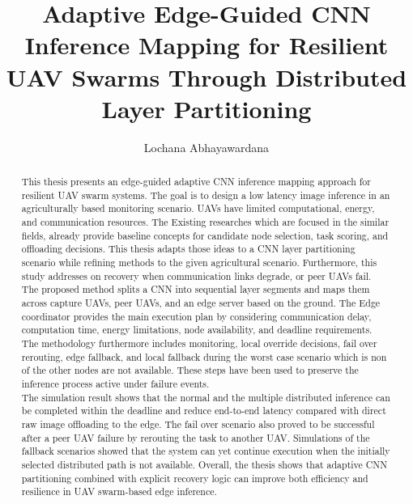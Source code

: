 \documentclass[HSHL, BachelorThesis]{teamhenkler}
\title{Adaptive Edge-Guided CNN Inference Mapping for Resilient UAV Swarms Through Distributed Layer Partitioning}
\author{Lochana Abhayawardana}
\begin{document}
\maketitle
\begin{abstract}
This thesis presents an edge-guided adaptive CNN inference mapping approach for resilient UAV swarm systems. The goal is to design a low latency image inference in an agriculturally based monitoring scenario. UAVs have limited computational, energy, and communication resources. The Existing researches which are focused in the similar fields, already provide baseline concepts for candidate node selection, task scoring, and offloading decisions. This thesis adapts those ideas to a CNN layer partitioning scenario while refining methods to the given agricultural scenario. Furthermore, this study addresses on recovery when communication links degrade, or peer UAVs fail.\\

The proposed method splits a CNN into sequential layer segments and maps them across capture UAVs, peer UAVs, and an edge server based on the ground.  The Edge coordinator provides the main execution plan by considering communication delay, computation time, energy limitations, node availability, and deadline requirements. The methodology furthermore includes monitoring, local override decisions, fail over rerouting, edge fallback, and local fallback during the worst case scenario which is non of the other nodes are not available. These steps have been used to preserve the inference process active under failure events. \\ 


The simulation result shows that the normal and the multiple distributed inference can be completed within the deadline and reduce end-to-end latency compared with direct raw image offloading to the edge. The fail over scenario also proved to be successful after a peer UAV failure by rerouting the task to another UAV. Simulations of the fallback scenarios showed that the system can yet continue execution when the initially selected distributed path is not available. Overall, the thesis shows that adaptive CNN partitioning combined with explicit recovery logic can improve both efficiency and resilience in UAV swarm-based edge inference.
\end{abstract}

\makedeclaration
\maketoc





\end{document}
